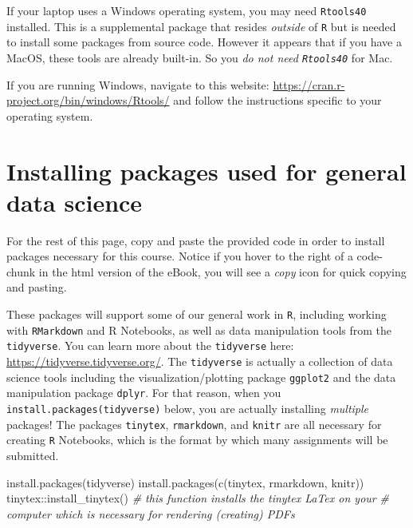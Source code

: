 \documentclass[
]{book}
\newenvironment{Shaded}{\begin{snugshade}}{\end{snugshade}}
\newcommand{\CommentTok}[1]{\textcolor[rgb]{0.56,0.35,0.01}{\textit{#1}}}
\newcommand{\FunctionTok}[1]{\textcolor[rgb]{0.00,0.00,0.00}{#1}}
\newcommand{\NormalTok}[1]{#1}
\newcommand{\SpecialCharTok}[1]{\textcolor[rgb]{0.00,0.00,0.00}{#1}}
\newcommand{\StringTok}[1]{\textcolor[rgb]{0.31,0.60,0.02}{#1}}
\begin{document}
If your laptop uses a Windows operating system, you may need \texttt{Rtools40} installed. This is a supplemental package that resides \emph{outside} of \texttt{R} but is needed to install some packages from source code. However it appears that if you have a MacOS, these tools are already built-in. So you \emph{do not need \texttt{Rtools40}} for Mac.

If you are running Windows, navigate to this website: \url{https://cran.r-project.org/bin/windows/Rtools/} and follow the instructions specific to your operating system.

\hypertarget{installing-packages-used-for-general-data-science}{%
\section*{Installing packages used for general data science}\label{installing-packages-used-for-general-data-science}}

For the rest of this page, copy and paste the provided code in order to install packages necessary for this course. Notice if you hover to the right of a code-chunk in the html version of the eBook, you will see a \emph{copy} icon for quick copying and pasting.

These packages will support some of our general work in \texttt{R}, including working with \texttt{RMarkdown} and R Notebooks, as well as data manipulation tools from the \texttt{tidyverse}. You can learn more about the \texttt{tidyverse} here: \url{https://tidyverse.tidyverse.org/}. The \texttt{tidyverse} is actually a collection of data science tools including the visualization/plotting package \texttt{ggplot2} and the data manipulation package \texttt{dplyr}. For that reason, when you \texttt{install.packages(\textquotesingle{}tidyverse\textquotesingle{})} below, you are actually installing \emph{multiple} packages! The packages \texttt{tinytex}, \texttt{rmarkdown}, and \texttt{knitr} are all necessary for creating \texttt{R} Notebooks, which is the format by which many assignments will be submitted.

\begin{Shaded}
\begin{Highlighting}[]
\FunctionTok{install.packages}\NormalTok{(}\StringTok{\textquotesingle{}tidyverse\textquotesingle{}}\NormalTok{)   }
\FunctionTok{install.packages}\NormalTok{(}\FunctionTok{c}\NormalTok{(}\StringTok{\textquotesingle{}tinytex\textquotesingle{}}\NormalTok{, }\StringTok{\textquotesingle{}rmarkdown\textquotesingle{}}\NormalTok{, }\StringTok{\textquotesingle{}knitr\textquotesingle{}}\NormalTok{)) }
\NormalTok{tinytex}\SpecialCharTok{::}\FunctionTok{install\_tinytex}\NormalTok{()  }
\CommentTok{\# this function installs the tinytex LaTex on your}
\CommentTok{\#  computer which is necessary for rendering (creating) PDF\textquotesingle{}s }
\end{Highlighting}
\end{Shaded}
\end{document}
